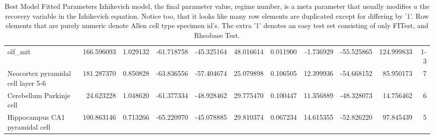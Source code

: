 \begin{table}
{\begin{tabular}{lrrrrrrrrrr}
olf\_mit                            &  166.596093 &  1.029132 & -61.718758 & -45.325164 &  48.016614 &  0.011900 &  -1.736929 & -55.525865 &  124.999833 &         1-3 \\
Neocortex pyramidal cell layer 5-6 &  181.287370 &  0.850828 & -63.836556 & -57.404674 &  25.079898 &  0.106505 &  12.399936 & -54.668152 &   85.950173 &         7 \\
Cerebellum Purkinje cell           &   24.623228 &  1.048620 & -61.377334 & -48.928462 &  29.775470 &  0.100447 &  11.356889 & -48.328073 &   14.756462 &         6 \\
Hippocampus CA1 pyramidal cell     &  100.863146 &  0.713266 & -65.220970 & -45.078885 &  29.810374 &  0.067234 &  14.615355 & -52.826220 &   97.845439 &         5 \\
\bottomrule
\end{tabular}}
\caption[Best Model Fitted Parameters Izhikevich model]{Best Model Fitted Parameters Izhikevich model, the final parameter value, regime number, is a meta parameter that usually modifies $u$ the recovery variable in the Izhikevich equation. Notice too, that it looks like many row elements are duplicated except for differing by '1'. Row elements that are purely numeric denote Allen cell type specimen id's. The extra '1' denotes an easy test set consisting of only FITest, and Rheobase Test.}
\end{table}
\clearpage

